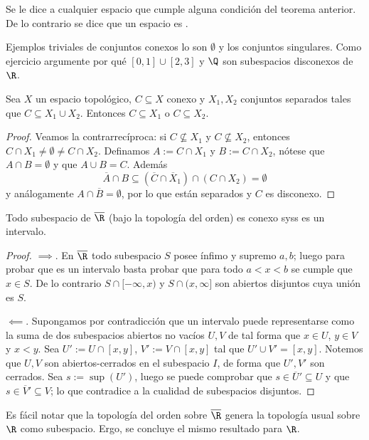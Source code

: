 \documentclass[topologia-analisis.tex]{subfiles}
\begin{document}
\begin{mydefi}
	Se le dice  a cualquier espacio que cumple alguna condición del teorema anterior. 
	De lo contrario se dice que un espacio es .
\end{mydefi}
Ejemplos triviales de conjuntos conexos lo son $\emptyset$ y los conjuntos singulares.
Como ejercicio argumente por qué $[0,1]\cup[2,3]$ y $\Q$ son subespacios disconexos de $\R$.

\begin{cor}
	Sea $X$ un espacio topológico, $C \subseteq X$ conexo y $X_1, X_2$ conjuntos separados tales que $C \subseteq X_1\cup X_2$.
	Entonces $C \subseteq X_1$ o $C \subseteq X_2$.
\end{cor}
\begin{proof}
	Veamos la contrarrecíproca: si $C \not\subseteq X_1$ y $C \not\subseteq X_2$, entonces $C\cap X_1 \ne \emptyset \ne C\cap X_2$.
	Definamos $A := C \cap X_1$ y $B := C\cap X_2$, nótese que $A\cap B = \emptyset$ y que $A \cup B = C$.
	Además
	$$ \overline A \cap B \subseteq (\overline C\cap\overline X_1) \cap (C\cap X_2) = \emptyset $$
	y análogamente $A \cap \overline B = \emptyset$, por lo que están separados y $C$ es disconexo.
\end{proof}

\begin{thmi}
	Todo subespacio de $\overline{\R}$ (bajo la topología del orden) es conexo syss es un intervalo.
\end{thmi}
\begin{proof}
	$\implies$.
	En $\overline{\R}$ todo subespacio $S$ posee ínfimo y supremo $a, b$;
	luego para probar que es un intervalo basta probar que para todo $a < x < b$ se cumple que $x \in S$.
	De lo contrario $S\cap [-\infty, x)$ y $S\cap(x, \infty]$ son abiertos disjuntos cuya unión es $S$.
	\par
	$\impliedby$.
	Supongamos por contradicción que un intervalo puede representarse como la suma de dos subespacios abiertos no vacíos $U, V$ de tal forma
	que $x\in U$, $y\in V$ y $x < y$. Sea $U' := U\cap[x,y]$, $V' := V\cap[x,y]$ tal que $U'\cup V' = [x,y]$.
	Notemos que $U,V$ son abiertos-cerrados en el subespacio $I$, de forma que $U',V'$ son cerrados.
	Sea $s := \sup(U')$, luego se puede comprobar que $s \in \overline U' \subseteq U$ y que $s \in \overline V' \subseteq V$;
	lo que contradice a la cualidad de subespacios disjuntos.
\end{proof}
Es fácil notar que la topología del orden sobre $\overline{\R}$ genera la topología usual sobre $\R$ como subespacio. Ergo, se concluye el mismo resultado para $\R$.
\end{document}
